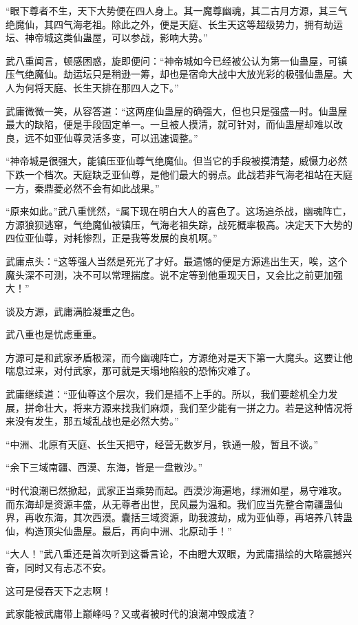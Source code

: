 \begin{this_body}
“眼下尊者不生，天下大势便在四人身上。其一魔尊幽魂，其二古月方源，其三气绝魔仙，其四气海老祖。除此之外，便是天庭、长生天这等超级势力，拥有劫运坛、神帝城这类仙蛊屋，可以参战，影响大势。”

武八重闻言，顿感困惑，旋即便问：“神帝城如今已经被公认为第一仙蛊屋，可镇压气绝魔仙。劫运坛只是稍逊一筹，却也是宿命大战中大放光彩的极强仙蛊屋。大人为何将天庭、长生天排在那四人之下。”

武庸微微一笑，从容答道：“这两座仙蛊屋的确强大，但也只是强盛一时。仙蛊屋最大的缺陷，便是手段固定单一。一旦被人摸清，就可针对，而仙蛊屋却难以改良，远不如亚仙尊灵活多变，可以迅速调整。”

“神帝城是很强大，能镇压亚仙尊气绝魔仙。但当它的手段被摸清楚，威慑力必然下跌一个档次。天庭缺乏亚仙尊，是他们最大的弱点。此战若非气海老祖站在天庭一方，秦鼎菱必然不会有如此战果。”

“原来如此。”武八重恍然，“属下现在明白大人的喜色了。这场追杀战，幽魂阵亡，方源狼狈逃窜，气绝魔仙被镇压，气海老祖失踪，战死概率极高。决定天下大势的四位亚仙尊，对耗惨烈，正是我等发展的良机啊。”

武庸点头：“这等强人当然是死光了才好。最遗憾的便是方源逃出生天，唉，这个魔头深不可测，决不可以常理揣度。说不定等到他重现天日，又会比之前更加强大！”

谈及方源，武庸满脸凝重之色。

武八重也是忧虑重重。

方源可是和武家矛盾极深，而今幽魂阵亡，方源绝对是天下第一大魔头。这要让他喘息过来，对付武家，那可就是天塌地陷般的恐怖灾难了。

武庸继续道：“亚仙尊这个层次，我们是插不上手的。所以，我们要趁机全力发展，拼命壮大，将来方源来找我们麻烦，我们至少能有一拼之力。若是这种情况将来没有发生，那五域乱战也是必然大势。”

“中洲、北原有天庭、长生天把守，经营无数岁月，铁通一般，暂且不谈。”

“余下三域南疆、西漠、东海，皆是一盘散沙。”

“时代浪潮已然掀起，武家正当乘势而起。西漠沙海遍地，绿洲如星，易守难攻。而东海却是资源丰盛，从无尊者出世，民风最为温和。我们应当先整合南疆蛊仙界，再收东海，其次西漠。囊括三域资源，助我渡劫，成为亚仙尊，再培养八转蛊仙，构造顶尖仙蛊屋。最后，再向中洲、北原动手！”

“大人！”武八重还是首次听到这番言论，不由瞪大双眼，为武庸描绘的大略震撼兴奋，同时又有忐忑不安。

这可是侵吞天下之志啊！

武家能被武庸带上巅峰吗？又或者被时代的浪潮冲毁成渣？


\end{this_body}
